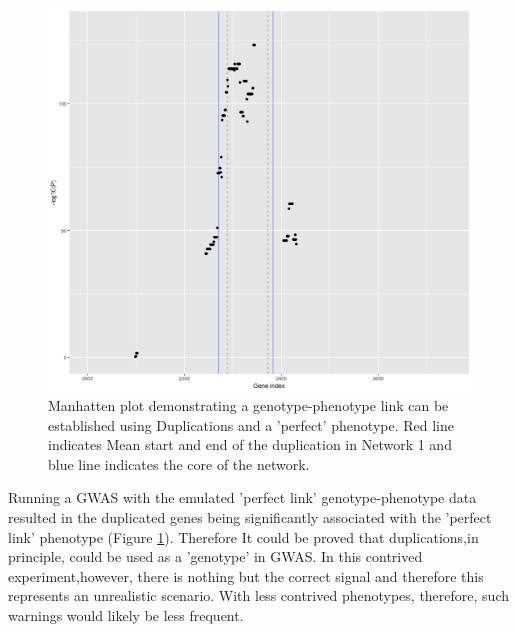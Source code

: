\documentclass{article}
\begin{document}
\begin{figure}[h!]
\centering
\includegraphics[width=\textwidth]{just core.png}
\caption{Manhatten plot demonstrating a genotype-phenotype link can be established using Duplications and a 'perfect' phenotype. Red line indicates Mean start and end of the duplication in Network 1 and blue line indicates the core of the network. }
\label{fig:Manhatten_1}
\end{figure}




Running a GWAS with the emulated 'perfect link' genotype-phenotype data resulted in the duplicated genes being significantly associated with the 'perfect link' phenotype (Figure \ref{fig:Manhatten_1}). Therefore It could be proved that duplications,in principle, could be used as a 'genotype' in GWAS. In this contrived experiment,however, there is nothing but the correct signal and therefore this represents an unrealistic scenario. With less contrived phenotypes, therefore, such warnings would likely be less frequent.
\end{document}

